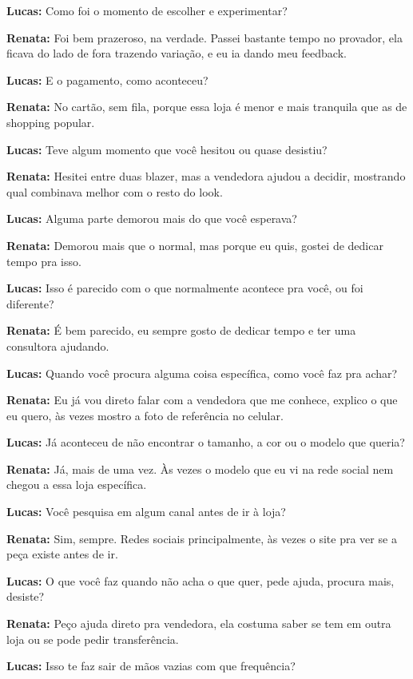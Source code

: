 \textbf{Lucas:} Como foi o momento de escolher e experimentar?

\textbf{Renata:} Foi bem prazeroso, na verdade. Passei bastante tempo no provador, ela ficava do lado de fora trazendo variação, e eu ia dando meu feedback.

\textbf{Lucas:} E o pagamento, como aconteceu?

\textbf{Renata:} No cartão, sem fila, porque essa loja é menor e mais tranquila que as de shopping popular.

\textbf{Lucas:} Teve algum momento que você hesitou ou quase desistiu?

\textbf{Renata:} Hesitei entre duas blazer, mas a vendedora ajudou a decidir, mostrando qual combinava melhor com o resto do look.

\textbf{Lucas:} Alguma parte demorou mais do que você esperava?

\textbf{Renata:} Demorou mais que o normal, mas porque eu quis, gostei de dedicar tempo pra isso.

\textbf{Lucas:} Isso é parecido com o que normalmente acontece pra você, ou foi diferente?

\textbf{Renata:} É bem parecido, eu sempre gosto de dedicar tempo e ter uma consultora ajudando.

\textbf{Lucas:} Quando você procura alguma coisa específica, como você faz pra achar?

\textbf{Renata:} Eu já vou direto falar com a vendedora que me conhece, explico o que eu quero, às vezes mostro a foto de referência no celular.

\textbf{Lucas:} Já aconteceu de não encontrar o tamanho, a cor ou o modelo que queria?

\textbf{Renata:} Já, mais de uma vez. Às vezes o modelo que eu vi na rede social nem chegou a essa loja específica.

\textbf{Lucas:} Você pesquisa em algum canal antes de ir à loja?

\textbf{Renata:} Sim, sempre. Redes sociais principalmente, às vezes o site pra ver se a peça existe antes de ir.

\textbf{Lucas:} O que você faz quando não acha o que quer, pede ajuda, procura mais, desiste?

\textbf{Renata:} Peço ajuda direto pra vendedora, ela costuma saber se tem em outra loja ou se pode pedir transferência.

\textbf{Lucas:} Isso te faz sair de mãos vazias com que frequência?


